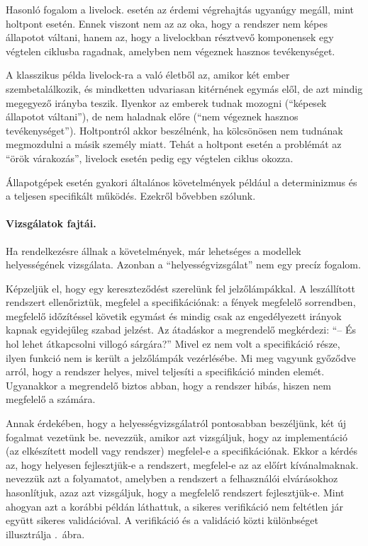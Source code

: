 Hasonló fogalom a livelock.  esetén az érdemi végrehajtás ugyanúgy megáll, mint holtpont esetén. Ennek viszont nem az az oka, hogy a rendszer nem képes állapotot váltani, hanem az, hogy a livelockban résztvevő komponensek egy végtelen ciklusba ragadnak, amelyben nem végeznek hasznos tevékenységet.

\begin{megjegyzes}
A klasszikus példa livelock-ra a való életből az, amikor két ember szembetalálkozik, és mindketten udvariasan kitérnének egymás elől, de azt mindig megegyező irányba teszik. Ilyenkor az emberek tudnak mozogni (``képesek állapotot váltani''), de nem haladnak előre (``nem végeznek hasznos tevékenységet''). Holtpontról akkor beszélnénk, ha kölcsönösen nem tudnának megmozdulni a másik személy miatt. Tehát a holtpont esetén a problémát az ``örök várakozás'', livelock esetén pedig egy végtelen ciklus okozza.
\end{megjegyzes}

Állapotgépek esetén gyakori általános követelmények például a determinizmus és a teljesen specifikált működés. Ezekről bővebben  szólunk.

\paragraph{Vizsgálatok fajtái.}
Ha rendelkezésre állnak a követelmények, már lehetséges a modellek helyességének vizsgálata. Azonban a ``helyességvizsgálat'' nem egy precíz fogalom. 

\begin{megjegyzes}
Képzeljük el, hogy egy kereszteződést szerelünk fel jelzőlámpákkal. A leszállított rendszert ellenőriztük, megfelel a specifikációnak: a fények megfelelő sorrendben, megfelelő időzítéssel követik egymást és mindig csak az engedélyezett irányok kapnak egyidejűleg szabad jelzést. Az átadáskor a megrendelő megkérdezi: ``-- És hol lehet átkapcsolni villogó sárgára?'' Mivel ez nem volt a specifikáció része, ilyen funkció nem is került a jelzőlámpák vezérlésébe. Mi meg vagyunk győződve arról, hogy a rendszer helyes, mivel teljesíti a specifikáció minden elemét. Ugyanakkor a megrendelő biztos abban, hogy a rendszer hibás, hiszen nem megfelelő a számára.
\end{megjegyzes}

Annak érdekében, hogy a helyességvizsgálatról pontosabban beszéljünk, két új fogalmat vezetünk be.  nevezzük, amikor azt vizsgáljuk, hogy az implementáció (az elkészített modell vagy rendszer) megfelel-e a specifikációnak. Ekkor a kérdés az, hogy helyesen fejlesztjük-e a rendszert, megfelel-e az az előírt kívánalmaknak.  nevezzük azt a folyamatot, amelyben a rendszert a felhasználói elvárásokhoz hasonlítjuk, azaz azt vizsgáljuk, hogy a megfelelő rendszert fejlesztjük-e. Mint ahogyan azt a korábbi példán láthattuk, a sikeres verifikáció nem feltétlen jár együtt sikeres validációval. A verifikáció és a validáció közti különbséget illusztrálja .~ábra.

